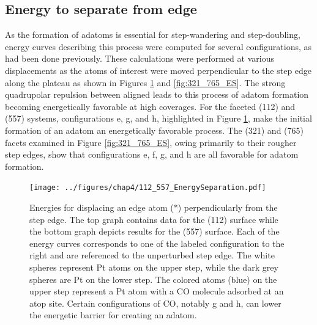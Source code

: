 \subsection{Energy to separate from edge}
As the formation of adatoms is essential for step-wandering and step-doubling,
energy curves describing this process were computed for several 
configurations, as had been done previously.  \citep{Michalka:2013aa,
Michalka:2015aa} These calculations were performed at various displacements as
the atoms of interest were moved perpendicular to the step edge along the
plateau as shown in Figures \ref{fig:112_557_ES} and \ref{fig:321_765_ES}. The
strong quadrupolar repulsion between aligned  leads to this process of
adatom formation becoming energetically favorable at high coverages. For the
faceted (112) and (557) systems, configurations e, g, and h, highlighted in
Figure \ref{fig:112_557_ES}, make the initial formation of an adatom an
energetically favorable process. The (321) and (765) facets examined in Figure
\ref{fig:321_765_ES}, owing primarily to their rougher step edges, show that
configurations e, f, g, and h are all favorable for adatom formation.

\begin{landscape}
\begin{figure}[p!]
  \centering
  \texttt{[image: ../figures/chap4/112\_557\_EnergySeparation.pdf]}
  \caption{Energies for displacing an edge atom (*) perpendicularly from the
step edge. The top graph contains data for the (112) surface while the bottom
graph depicts results for the (557) surface.  Each of the energy curves
corresponds to one of the labeled configuration to the right and are referenced
to the unperturbed step edge. The white spheres represent Pt atoms on the upper
step, while the dark grey spheres are Pt on the lower step.  The colored atoms
(blue) on the upper step represent a Pt atom with a CO molecule adsorbed at an
atop site. Certain configurations of CO, notably g and h, can lower the
energetic barrier for creating an adatom.}
\label{fig:112_557_ES}
\end{figure}
\end{landscape}

